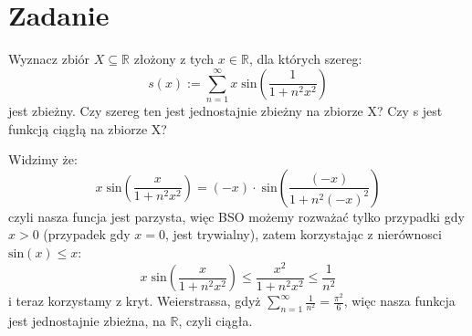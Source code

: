 \documentclass[11pt]{scrartcl}
\begin{document}
    \section{Zadanie}
      \begin{zadanie}
          Wyznacz zbiór $X \subseteq \mathbb{R} $ złożony z tych $x \in \mathbb{R} $, dla których szereg:
          \[
              s(x) := \sum_{n = 1}^{\infty } x \; \text{sin} \left ( \frac{1}{1 + n^2 x^2} \right )   
          \]
          jest zbieżny. Czy szereg ten jest jednostajnie zbieżny na zbiorze X? Czy s jest funkcją ciągłą na
zbiorze X?
      \end{zadanie}
      Widzimy że:
      \[
          x \; \text{sin} \left ( \frac{x}{1 + n^2 x^2} \right ) = (-x) \cdot \; \text{sin} \left ( \frac{(-x)}{1 + n^2 (-x)^2} \right ) 
      \]
      czyli nasza funcja jest parzysta, więc BSO możemy rozważać tylko przypadki gdy $x > 0$ (przypadek gdy $x= 0$, jest trywialny), zatem korzystając z nierównosci $\text{sin} \left ( x \right ) \leq x$:
      \[
          x \; \text{sin} \left ( \frac{x}{1 + n^2 x^2} \right ) \leq \frac{x^2}{1 + n^2 x^2} \leq \frac{1}{n^2}
      \]
      i teraz korzystamy z kryt. Weierstrassa, gdyż $\sum_{n = 1}^{\infty } \frac{1}{n^2} = \frac{\pi^2 }{6}$, więc nasza funkcja jest jednostajnie zbieżna, na $\mathbb{R} $, czyli ciągła.
\end{document}
